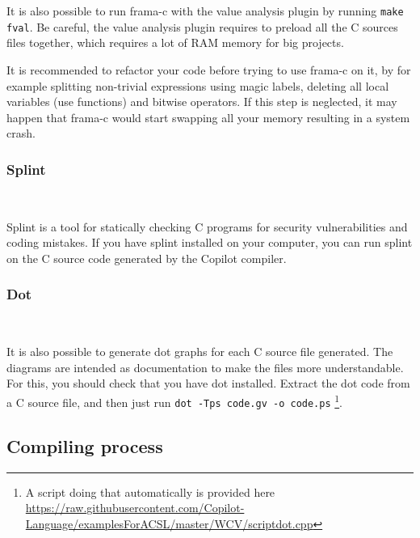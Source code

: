 It is also possible to run frama-c with the value analysis plugin by running
\texttt{make fval}. Be careful, the value analysis plugin requires to preload
all the C sources files together, which requires a lot of RAM memory for big
projects.

It is recommended to refactor your code before trying to use frama-c on it, by for example splitting non-trivial expressions using magic labels, deleting all
local variables (use functions) and bitwise operators. If this step is
neglected, it may happen that frama-c would start swapping all your memory
resulting in a system crash.

\subsubsection{Splint}~\label{subsec:splint}

Splint is a tool for statically checking C programs for security vulnerabilities and coding mistakes.
If you have splint installed on your computer, you can 
run splint on the C source code  generated by the Copilot compiler.



\subsubsection{Dot}~\label{subsec:dot}

It is also possible to generate dot graphs for each C source file
generated. The diagrams are intended as documentation 
to make the files more understandable. For this, you should check that
you have dot installed. Extract the dot code from a C source file, and then
just run \texttt{dot -Tps code.gv -o code.ps}
%
\footnote{A script doing that automatically is provided here
\url{https://raw.githubusercontent.com/Copilot-Language/examplesForACSL/master/WCV/scriptdot.cpp}}.

\subsection{Compiling process}



